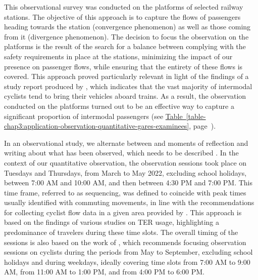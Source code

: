 \begin{refsegment}
This observational survey was conducted on the platforms of selected railway stations. The objective of this approach is to capture the flows of passengers heading towards the station (convergence phenomenon) as well as those coming from it (divergence phenomenon). The decision to focus the observation on the platforms is the result of the search for a balance between complying with the safety requirements in place at the stations, minimizing the impact of our presence on passenger flows, while ensuring that the entirety of these flows is covered. This approach proved particularly relevant in light of the findings of a study report produced by \textcolor{blue}{\textcite[13]{enov_enquete_2021}}, which indicates that the vast majority of intermodal cyclists tend to bring their vehicles aboard trains. As a result, the observation conducted on the platforms turned out to be an effective way to capture a significant proportion of intermodal passengers (see \hyperref[table-chap3:application-observation-quantitative-gares-examinees]{Table~\ref{table-chap3:application-observation-quantitative-gares-examinees}}, page~\pageref{table-chap3:application-observation-quantitative-gares-examinees}).%


In an observational study, we alternate between  and moments of reflection and writing about what has been observed, which needs to be described \textcolor{blue}{\autocite[15]{revillard_observation_2018}}. In the context of our quantitative observation, the observation sessions took place on Tuesdays and Thursdays, from March to May 2022, excluding school holidays, between 7:00 AM and 10:00 AM, and then between 4:30 PM and 7:00 PM. This time frame, referred to as sequencing, was defined to coincide with peak times usually identified with commuting movements, in line with the recommendations for collecting cyclist flow data in a given area provided by \textcolor{blue}{\textcite[20]{johnstone_collecting_2017}}. This approach is based on the findings of various studies on TER usage, highlighting a predominance of travelers during these time slots. The overall timing of the sessions is also based on the work of \textcolor{blue}{\textcite[20]{johnstone_collecting_2017}}, which recommends focusing observation sessions on cyclists during the periods from May to September, excluding school holidays and during weekdays, ideally covering time slots from 7:00 AM to 9:00 AM, from 11:00 AM to 1:00 PM, and from 4:00 PM to 6:00 PM. %


\end{refsegment}
